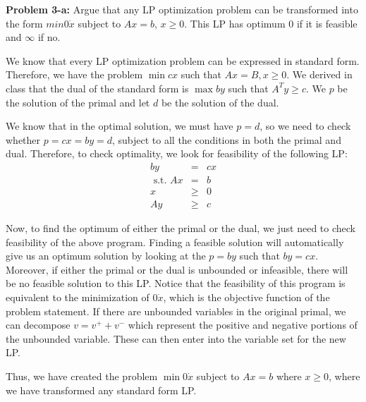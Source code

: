 \documentclass[psamsfonts]{amsart}
\newenvironment{sol}{\vspace{0.25cm}{\large \bfseries Solution:}}{\qedsymbol}
\newenvironment{prob}[1]{\begin{framed}{\large \bfseries Problem #1:}}{\end{framed}}
\begin{document}
\begin{prob}{3-a}
Argue that any LP optimization problem can be transformed into the form $min 0 \dot x$ subject to $Ax = b$, $x \geq 0$. This LP has optimum $0$ if it is feasible and $\infty$ if no. 
\end{prob}
\begin{sol}
We know that every LP optimization problem can be expressed in standard form. Therefore, we have the problem $\min cx$ such that $Ax = B, x\geq 0$. We derived in class that the dual of the standard form is $\max by$ such that $A^T y \geq c$. We $p$ be the solution of the primal and let $d$ be the solution of the dual. 

We know that in the optimal solution, we must have $p = d$, so we need to check whether $p = cx = by = d$, subject to all the conditions in both the primal and dual. Therefore, to check optimality, we look for feasibility of the following LP:
\begin{eqnarray}
by &=& cx \\
\text{ s.t. } Ax &=& b \\
x &\geq& 0 \\
Ay &\geq& c
\end{eqnarray}

Now, to find the optimum of either the primal or the dual, we just need to check feasibility of the above program. Finding a feasible solution will automatically give us an optimum solution by looking at the $p = by$ such that $by = cx$. Moreover, if either the primal or the dual is unbounded or infeasible, there will be no feasible solution to this LP. Notice that the feasibility of this program is equivalent to the minimization of $0 \dot x$, which is the objective function of the problem statement. If there are unbounded variables in the original primal, we can decompose $v = v^+ + v^-$ which represent the positive and negative portions of the unbounded variable. These can then enter into the variable set for the new LP.

Thus, we have created the problem $\min 0 \dot x$ subject to $Ax = b$ where $x \geq 0$, where we have transformed any standard form LP. 
\end{sol}
\end{document}
